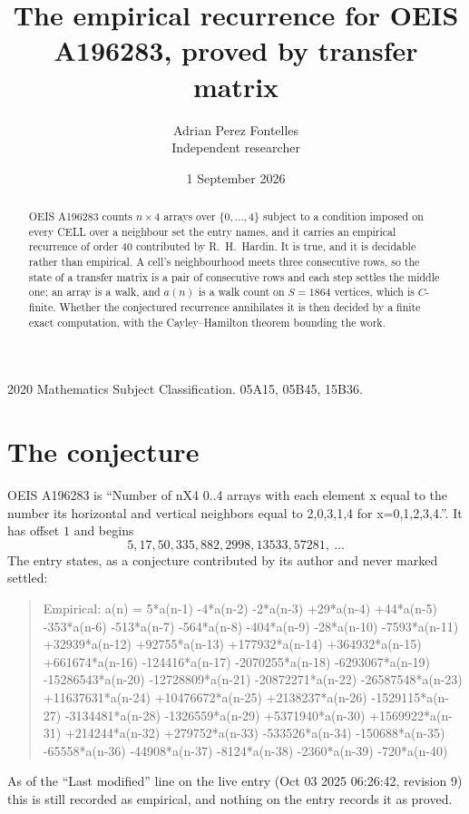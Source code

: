 \documentclass[11pt,a4paper]{article}
\title{The empirical recurrence for OEIS A196283, proved by transfer matrix}
\author{Adrian Perez Fontelles\\ \small Independent researcher}
\date{1 September 2026}
\theoremstyle{plain}
\theoremstyle{definition}
\begin{document}
\maketitle

\begin{abstract}
OEIS A196283 counts $n\times4$ arrays over $\{0,\dots,4\}$ subject to a condition imposed on
every CELL over a neighbour set the entry names, and it carries an empirical recurrence of
order $40$ contributed by R.~H.~Hardin. It is true, and it is decidable rather than
empirical. A cell's neighbourhood meets three consecutive rows, so the state of a transfer
matrix is a pair of consecutive rows and each step settles the middle one; an array is a
walk, and $a(n)$ is a walk count on $S=1864$ vertices, which is $C$-finite. Whether the
conjectured recurrence annihilates it is then decided by a finite exact computation, with the
Cayley--Hamilton theorem bounding the work.
\end{abstract}

\noindent\small 2020 Mathematics Subject Classification. 05A15, 05B45, 15B36.\normalsize

\section{The conjecture}

OEIS A196283 is ``Number of nX4 0..4 arrays with each element x equal to the number its horizontal and vertical neighbors equal to 2,0,3,1,4 for x=0,1,2,3,4.''. It has offset $1$ and begins
\[
5, 17, 50, 335, 882, 2998, 13533, 57281,\ \dots
\]
The entry states, as a conjecture contributed by its author and never marked settled:
\begin{quote}
Empirical: a(n) = 5*a(n-1) -4*a(n-2) -2*a(n-3) +29*a(n-4) +44*a(n-5) -353*a(n-6) -513*a(n-7) -564*a(n-8) -404*a(n-9) -28*a(n-10) -7593*a(n-11) +32939*a(n-12) +92755*a(n-13) +177932*a(n-14) +364932*a(n-15) +661674*a(n-16) -124416*a(n-17) -2070255*a(n-18) -6293067*a(n-19) -15286543*a(n-20) -12728809*a(n-21) -20872271*a(n-22) -26587548*a(n-23) +11637631*a(n-24) +10476672*a(n-25) +2138237*a(n-26) -1529115*a(n-27) -3134481*a(n-28) -1326559*a(n-29) +5371940*a(n-30) +1569922*a(n-31) +214244*a(n-32) +279752*a(n-33) -533526*a(n-34) -150688*a(n-35) -65558*a(n-36) -44908*a(n-37) -8124*a(n-38) -2360*a(n-39) -720*a(n-40)
\end{quote}
As of the ``Last modified'' line on the live entry (Oct 03 2025 06:26:42, revision 9) this is still
recorded as empirical, and nothing on the entry records it as proved.
\end{document}
